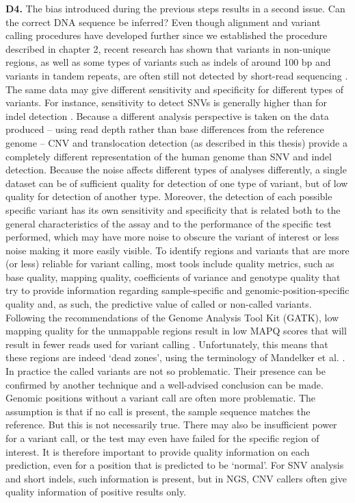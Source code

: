 \textbf{D4.} The bias introduced during the previous steps results in a second issue. 
Can the correct DNA sequence be inferred? 
Even though alignment and variant calling procedures have developed further since we established the procedure described in chapter 2, recent research has shown that variants in non-unique regions, as well as some types of variants such as indels of around 100 bp and variants in tandem repeats, are often still not detected by short-read sequencing \cite{Lincoln_2017}. 
The same data may give different sensitivity and specificity for different types of variants. 
For instance, sensitivity to detect SNVs is generally higher than for indel detection \cite{Elferink_2017}. 
Because a different analysis perspective is taken on the data produced – using read depth rather than base differences from the reference genome – CNV and translocation detection (as described in this thesis) provide a completely different representation of the human genome than SNV and indel detection. 
Because the noise affects different types of analyses differently, a single dataset can be of sufficient quality for detection of one type of variant, but of low quality for detection of another type. 
Moreover, the detection of each possible specific variant has its own sensitivity and specificity that is related both to the general characteristics of the assay and to the performance of the specific test performed, which may have more noise to obscure the variant of interest or less noise making it more easily visible. 
To identify regions and variants that are more (or less) reliable for variant calling, most tools include quality metrics, such as base quality, mapping quality, coefficients of variance and genotype quality that try to provide information regarding sample-specific and genomic-position-specific quality and, as such, the predictive value of called or non-called variants. 
Following the recommendations of the Genome Analysis Tool Kit (GATK), low mapping quality for the unmappable regions result in low MAPQ scores that will result in fewer reads used for variant calling \cite{GATK_2017}. 
Unfortunately, this means that these regions are indeed ‘dead zones’, using the terminology of Mandelker et al. \cite{Mandelker_2016}. 
In practice the called variants are not so problematic. Their presence can be confirmed by another technique and a well-advised conclusion can be made. 
Genomic positions without a variant call are often more problematic. 
The assumption is that if no call is present, the sample sequence matches the reference. 
But this is not necessarily true. There may also be insufficient power for a variant call, or the test may even have failed for the specific region of interest. 
It is therefore important to provide quality information on each prediction, even for a position that is predicted to be ‘normal’. 
For SNV analysis and short indels, such information is present, but in NGS, CNV callers often give quality information of positive results only. 

